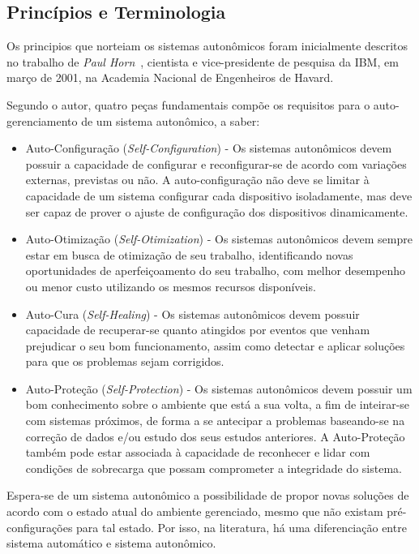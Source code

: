 \documentclass[11pt,twoside]{article}
\begin{document}
\subsection{Princípios e Terminologia}
Os principios que norteiam os sistemas autonômicos foram inicialmente descritos no trabalho de \textit{Paul Horn}~\cite{KEPHART}, cientista e vice-presidente de pesquisa da IBM, em março de 2001, na Academia Nacional de Engenheiros de Havard. 

Segundo o autor, quatro peças fundamentais compõe os requisitos para o auto-gerenciamento de um sistema autonômico, a saber:

\begin{itemize}
\item Auto-Configuração (\textit{Self-Configuration}) - Os sistemas autonômicos devem possuir a capacidade de configurar e reconfigurar-se de acordo com variações externas, previstas ou não. A auto-configuração não deve se limitar à capacidade de um sistema configurar cada dispositivo isoladamente, mas deve ser capaz de prover o ajuste de configuração dos dispositivos dinamicamente.

\item Auto-Otimização (\textit{Self-Otimization}) - Os sistemas autonômicos devem sempre estar em busca de otimização de seu trabalho, identificando novas oportunidades de aperfeiçoamento do seu trabalho, com melhor desempenho ou menor custo utilizando os mesmos recursos disponíveis.

\item Auto-Cura (\textit{Self-Healing}) - Os sistemas autonômicos devem possuir capacidade de recuperar-se quanto atingidos por eventos que venham prejudicar o seu bom funcionamento, assim como detectar e aplicar soluções para que os problemas sejam corrigidos. 

\item Auto-Proteção (\textit{Self-Protection}) - Os sistemas autonômicos devem possuir um bom conhecimento sobre o ambiente que está a sua volta, a fim de inteirar-se com sistemas próximos, de forma a se antecipar a problemas baseando-se na correção de dados e/ou estudo dos seus estudos anteriores. A Auto-Proteção também pode estar associada à capacidade de reconhecer e lidar com condições de sobrecarga que possam comprometer a integridade do sistema.

\end{itemize}
Espera-se de um sistema autonômico a possibilidade de propor novas soluções de acordo com o estado atual do ambiente gerenciado, mesmo que não existam pré-configurações para tal estado. Por isso, na literatura, há uma diferenciação entre sistema automático e sistema autonômico. 
\end{document}
